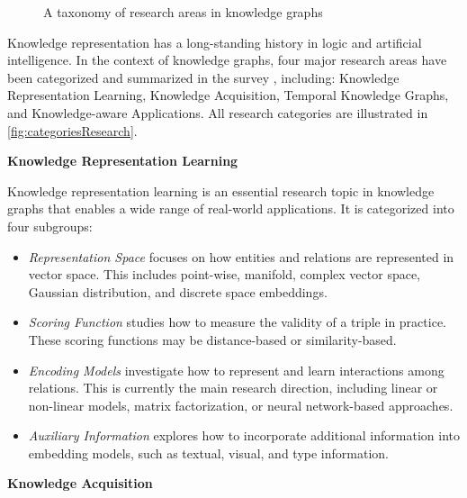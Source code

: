 \begin{figure*}[htp]
{
}
	\caption{
		A taxonomy of research areas in knowledge graphs}
	\label{fig:categoriesResearch}
\end{figure*}


Knowledge representation has a long-standing history in logic and artificial intelligence. In the context of knowledge graphs, four major research areas have been categorized and summarized in the survey \cite{ji2020survey}, including: Knowledge Representation Learning, Knowledge Acquisition, Temporal Knowledge Graphs, and Knowledge-aware Applications. All research categories are illustrated in \autoref{fig:categoriesResearch}.

\textbf{Knowledge Representation Learning}

Knowledge representation learning is an essential research topic in knowledge graphs that enables a wide range of real-world applications. It is categorized into four subgroups:

\begin{itemize}
	\item \textit{Representation Space} focuses on how entities and relations are represented in vector space. This includes point-wise, manifold, complex vector space, Gaussian distribution, and discrete space embeddings.
	
	\item \textit{Scoring Function} studies how to measure the validity of a triple in practice. These scoring functions may be distance-based or similarity-based.
	
	\item \textit{Encoding Models} investigate how to represent and learn interactions among relations. This is currently the main research direction, including linear or non-linear models, matrix factorization, or neural network-based approaches.
	
	\item \textit{Auxiliary Information} explores how to incorporate additional information into embedding models, such as textual, visual, and type information.
\end{itemize}

\textbf{Knowledge Acquisition}

